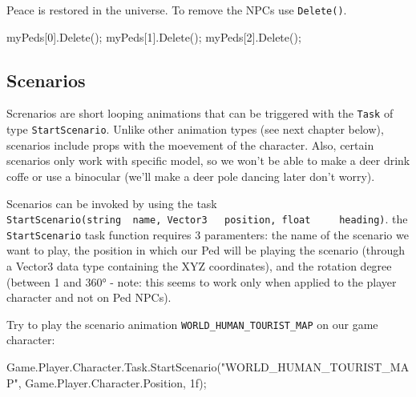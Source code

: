 \documentclass[
  openany]{book}
\newenvironment{Shaded}{\begin{snugshade}}{\end{snugshade}}
\newcommand{\DecValTok}[1]{\textcolor[rgb]{0.00,0.00,0.81}{#1}}
\newcommand{\FunctionTok}[1]{\textcolor[rgb]{0.00,0.00,0.00}{#1}}
\newcommand{\NormalTok}[1]{#1}
\newcommand{\StringTok}[1]{\textcolor[rgb]{0.31,0.60,0.02}{#1}}
\begin{document}
Peace is restored in the universe. To remove the NPCs use \texttt{Delete()}.

\begin{Shaded}
\begin{Highlighting}[]
\NormalTok{myPeds[}\DecValTok{0}\NormalTok{].}\FunctionTok{Delete}\NormalTok{();}
\NormalTok{myPeds[}\DecValTok{1}\NormalTok{].}\FunctionTok{Delete}\NormalTok{();}
\NormalTok{myPeds[}\DecValTok{2}\NormalTok{].}\FunctionTok{Delete}\NormalTok{();}
\end{Highlighting}
\end{Shaded}

\hypertarget{scenarios}{%
\subsection*{Scenarios}\label{scenarios}}

Screnarios are short looping animations that can be triggered with the \texttt{Task} of type \texttt{StartScenario}. Unlike other animation types (see next chapter below), scenarios include props with the moevement of the character. Also, certain scenarios only work with specific model, so we won't be able to make a deer drink coffe or use a binocular (we'll make a deer pole dancing later don't worry).

Scenarios can be invoked by using the task \texttt{StartScenario(string\ \ name,\ Vector3\ \ \ position,\ float\ \ \ \ \ heading)}. the \texttt{StartScenario} task function requires 3 paramenters: the name of the scenario we want to play, the position in which our Ped will be playing the scenario (through a Vector3 data type containing the XYZ coordinates), and the rotation degree (between 1 and 360° - note: this seems to work only when applied to the player character and not on Ped NPCs).

Try to play the scenario animation \texttt{WORLD\_HUMAN\_TOURIST\_MAP} on our game character:

\begin{Shaded}
\begin{Highlighting}[]
\NormalTok{Game.}\FunctionTok{Player}\NormalTok{.}\FunctionTok{Character}\NormalTok{.}\FunctionTok{Task}\NormalTok{.}\FunctionTok{StartScenario}\NormalTok{(}\StringTok{"WORLD_HUMAN_TOURIST_MAP"}\NormalTok{, Game.}\FunctionTok{Player}\NormalTok{.}\FunctionTok{Character}\NormalTok{.}\FunctionTok{Position}\NormalTok{, 1f);}
\end{Highlighting}
\end{Shaded}
\end{document}
